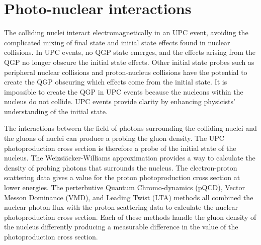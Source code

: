 \chapter{Photo-nuclear interactions \label{ch:photoNuc}}
    The colliding nuclei interact electromagnetically in an UPC event, avoiding
      the complicated mixing of final state and initial state effects found 
      in nuclear collisions.
    In UPC events, no QGP state emerges, and the effects arising from the QGP 
      no longer obscure the initial state effects.
    Other initial state probes such as peripheral nuclear collisions and 
      proton-nucleus collisions have the potential to create the QGP obscuring 
      which effects come from the initial state.
    It is impossible to create the QGP in UPC events because the nucleons 
      within the nucleus do not collide. 
    UPC events provide clarity by enhancing physicists' 
      understanding of the initial state. 
    
    The interactions between the field of photons surrounding the colliding 
      nuclei and the gluons of nuclei can produce a \JPsi{} probing the 
      gluon density.
    The UPC \JPsi{} photoproduction cross section is therefore a probe of 
      the initial state of the nucleus. 
    The Weizsi\"{a}cker-Williams approximation provides a way to calculate the 
      density of probing photons that surrounds the nucleus. 
    The electron-proton scattering data gives a value for the proton 
      photoproduction cross section at lower energies.
    The perterbutive Quantum Chromo-dynamics (pQCD), Vector Messon Dominance 
      (VMD), and Leading Twist (LTA) methods all combined the nuclear photon 
      flux with the proton scattering data to calculate the nuclear 
      photoproduction cross section.
    Each of these methods handle the gluon density of the nucleus differently 
      producing a measurable difference in the value of the \JPsi{} 
      photoproduction cross section. 

